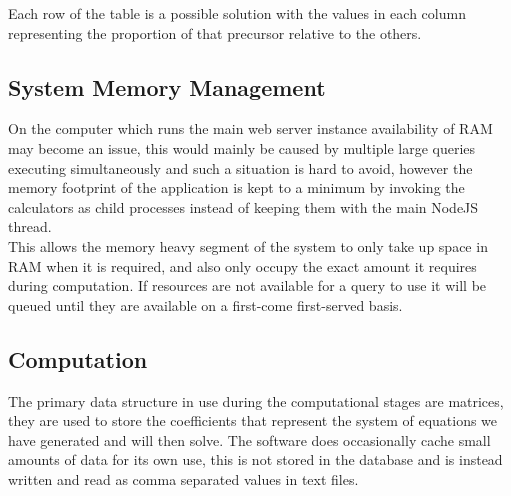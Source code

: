 \documentclass[a4paper, 12pt]{article}
\begin{document}
Each row of the table is a possible solution with the values in each column representing the proportion of that precursor relative to the others.

\subsection{System Memory Management}
On the computer which runs the main web server instance availability of RAM may become an issue, this would mainly be caused by multiple large queries executing simultaneously and such a situation is hard to avoid, however the memory footprint of the application is kept to a minimum by invoking the calculators as child processes instead of keeping them with the main NodeJS thread.\\

This allows the memory heavy segment of the system to only take up space in RAM when it is required, and also only occupy the exact amount it requires during computation. If resources are not available for a query to use it will be queued until they are available on a first-come first-served basis. 

\subsection{Computation}
The primary data structure in use during the computational stages are matrices, they are used to store the coefficients that represent the system of equations we have generated and will then solve. The software does occasionally cache small amounts of data for its own use, this is not stored in the database and is instead written and read as comma separated values in text files.
\end{document}
